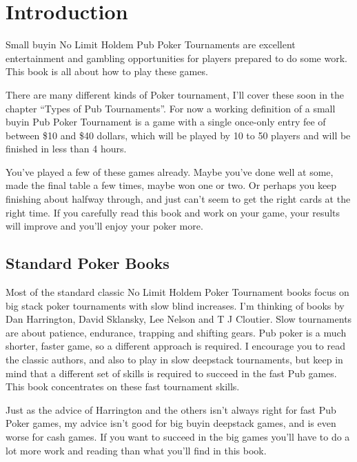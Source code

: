 \chapter{Introduction}


Small buyin No Limit Holdem Pub Poker Tournaments are excellent
entertainment and gambling opportunities for players prepared to do
some work. This book is all about how to play these games.

There are many different kinds of Poker tournament, I'll cover these
soon in the chapter ``Types of Pub Tournaments''. For now a
working definition of a small buyin
Pub Poker Tournament is a game with a single once-only entry fee of
between \$10 and \$40 dollars, which will be played by 10 to 50
players and will be finished in less than 4 hours.

You've played a few of these games already. Maybe you've done well at
some, made the final table a few times, maybe won one or two.
Or perhaps you keep finishing about halfway through, and just can't
seem to get the right cards at the right time. If you carefully read
this book and work on your game, your results will improve and you'll
enjoy your poker more.

\section*{Standard Poker Books}


Most of the standard classic No Limit Holdem Poker Tournament books
focus on big stack poker tournaments with slow blind increases.
I'm thinking of books by Dan Harrington, David Sklansky, Lee Nelson
and T J Cloutier. Slow tournaments are about patience, endurance,
trapping and shifting gears. Pub poker is a much
shorter, faster game, so a different approach
is required. I encourage you to read the
classic authors, and also to play in slow deepstack tournaments,
but keep in mind that a different set of skills is required to succeed
in the fast Pub games. This book concentrates on these fast
tournament skills.

Just as the advice of Harrington and the others isn't always right
for fast Pub Poker games, my advice isn't good
for big buyin deepstack games, and is even worse for
cash games. If you want to succeed in the big games you'll have to do a
lot more work and reading than what you'll find in this book.

